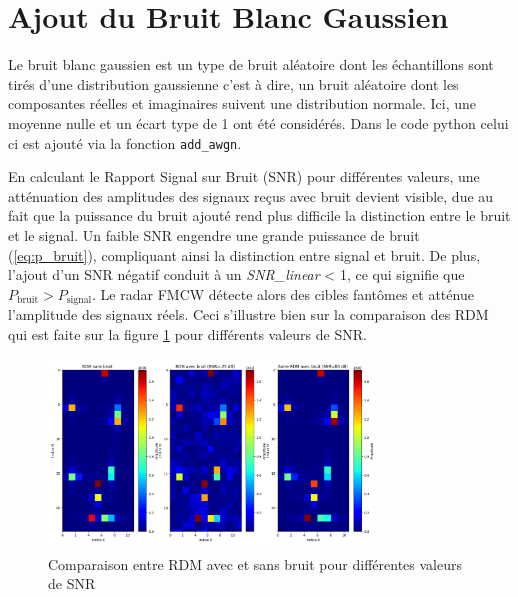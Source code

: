 \section{Ajout du Bruit Blanc Gaussien }
Le bruit blanc gaussien est un type de bruit aléatoire dont les échantillons sont tirés d'une distribution gaussienne c'est à dire, un bruit aléatoire dont les composantes réelles et imaginaires suivent une distribution normale. Ici, une moyenne nulle et un écart type de 1 ont été considérés.
Dans le code python celui ci est ajouté via la fonction \texttt{add\_awgn}.

En calculant le Rapport Signal sur Bruit (SNR) pour différentes valeurs, une atténuation des amplitudes des signaux reçus avec bruit devient visible, due au fait que la puissance du bruit ajouté rend plus difficile la distinction entre le bruit et le signal. Un faible SNR engendre une grande puissance de bruit (\ref{eq:p_bruit}), compliquant ainsi la distinction entre signal et bruit. De plus, l'ajout d'un SNR négatif conduit à un \textit{SNR\_linear} < 1, ce qui signifie que $P_{\text{bruit}} > P_{\text{signal}}$. Le radar FMCW détecte alors des cibles fantômes et atténue l'amplitude des signaux réels. Ceci s'illustre bien sur la comparaison des RDM qui est faite sur la figure \ref{fig:rdm_wn} pour différents valeurs de SNR.

\begin{figure}[H]
    \centering
    \includegraphics[width=0.77\textwidth]{Pictures/RDM_WITH_WITHOUT_SST_P.png}
    \caption{Comparaison entre RDM avec et sans bruit pour différentes valeurs de SNR}
    \label{fig:rdm_wn}
\end{figure}